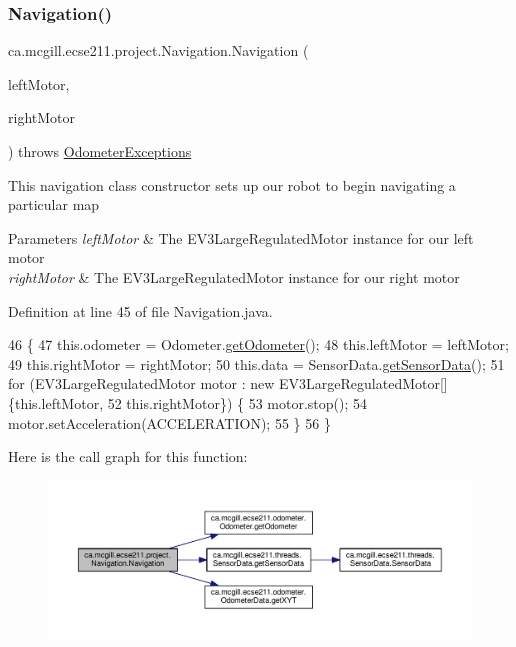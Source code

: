 \subsubsection{\texorpdfstring{Navigation()}{Navigation()}}
{\footnotesize\ttfamily ca.\+mcgill.\+ecse211.\+project.\+Navigation.\+Navigation (\begin{DoxyParamCaption}\item[{E\+V3\+Large\+Regulated\+Motor}]{left\+Motor,  }\item[{E\+V3\+Large\+Regulated\+Motor}]{right\+Motor }\end{DoxyParamCaption}) throws \hyperlink{classca_1_1mcgill_1_1ecse211_1_1odometer_1_1_odometer_exceptions}{Odometer\+Exceptions}}

This navigation class constructor sets up our robot to begin navigating a particular map


\begin{DoxyParams}{Parameters}
{\em left\+Motor} & The E\+V3\+Large\+Regulated\+Motor instance for our left motor \\
\hline
{\em right\+Motor} & The E\+V3\+Large\+Regulated\+Motor instance for our right motor \\
\hline
\end{DoxyParams}


Definition at line 45 of file Navigation.\+java.


\begin{DoxyCode}
46                                 \{
47     this.odometer = Odometer.\hyperlink{classca_1_1mcgill_1_1ecse211_1_1odometer_1_1_odometer_a99171f11e34dea918fa9dd069d721439}{getOdometer}();
48     this.leftMotor = leftMotor;
49     this.rightMotor = rightMotor;
50     this.data = SensorData.\hyperlink{classca_1_1mcgill_1_1ecse211_1_1threads_1_1_sensor_data_a8260aba53b4474ca1275e4ce26157977}{getSensorData}();
51     \textcolor{keywordflow}{for} (EV3LargeRegulatedMotor motor : \textcolor{keyword}{new} EV3LargeRegulatedMotor[] \{this.leftMotor,
52         this.rightMotor\}) \{
53       motor.stop();
54       motor.setAcceleration(ACCELERATION);
55     \}
56   \}
\end{DoxyCode}
Here is the call graph for this function\+:
\nopagebreak
\begin{figure}[H]
\begin{center}
\leavevmode
\includegraphics[width=350pt]{classca_1_1mcgill_1_1ecse211_1_1project_1_1_navigation_aaee14b67c392ddd951e3ce21224c3e56_cgraph}
\end{center}
\end{figure}


